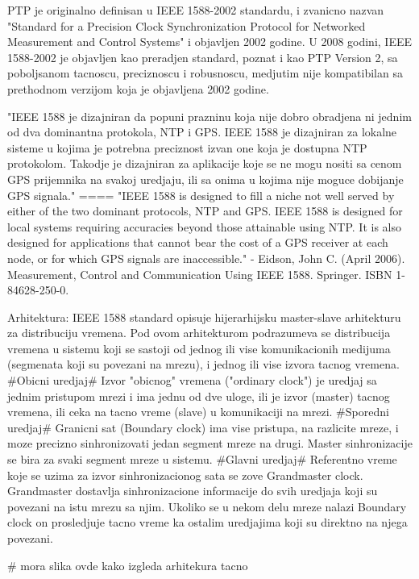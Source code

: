 \documentclass[a4paper,12pt, master]{etf}
\begin{document}
	PTP je originalno definisan u IEEE 1588-2002 standardu, i zvanicno nazvan
	"Standard for a Precision Clock Synchronization Protocol for Networked Measurement
	and Control Systems" i objavljen 2002 godine. U 2008 godini, IEEE 1588-2002 je
	objavljen kao preradjen standard, poznat i kao PTP Version 2, sa poboljsanom tacnoscu,
	preciznoscu i robusnoscu, medjutim nije kompatibilan sa prethodnom verzijom koja je 
	objavljena 2002 godine.

	"IEEE 1588 je dizajniran da popuni prazninu koja nije dobro obradjena ni jednim od dva
	dominantna protokola, NTP i GPS. IEEE 1588 je dizajniran za lokalne sisteme u kojima je
	potrebna preciznost izvan one koja je dostupna NTP protokolom. Takodje je dizajniran za
	aplikacije koje se ne mogu nositi sa cenom GPS prijemnika na svakoj uredjaju, ili sa onima 
	u kojima nije moguce dobijanje GPS signala."
	====
	"IEEE 1588 is designed to fill a niche not well served by either of the two dominant 
	protocols, NTP and GPS. IEEE 1588 is designed for local systems requiring accuracies 
	beyond those attainable using NTP. It is also designed for applications that cannot bear 
	the cost of a GPS receiver at each node, or for which GPS signals are inaccessible." - 
	Eidson, John C. (April
	2006). Measurement, Control and Communication Using IEEE 1588. Springer. ISBN 
	1-84628-250-0.

	Arhitektura:
	IEEE 1588 standard opisuje hijerarhijsku master-slave arhitekturu za distribuciju vremena. 
	Pod	ovom arhitekturom podrazumeva se distribucija vremena u sistemu koji se sastoji od 
	jednog ili vise komunikacionih medijuma (segmenata koji su povezani na mrezu), i jednog 
	ili vise izvora	tacnog vremena. \#Obicni uredjaj\# Izvor "obicnog" vremena ("ordinary 
	clock") je uredjaj sa jednim pristupom mrezi i ima jednu od dve uloge, ili je izvor  
	(master) tacnog vremena, ili ceka na tacno vreme (slave) u komunikaciji na mrezi. 
	\#Sporedni uredjaj\# Granicni sat (Boundary	clock) ima vise pristupa, na razlicite mreze, 
	i moze precizno sinhronizovati jedan segment mreze na drugi. Master sinhronizacije se bira 
	za svaki segment mreze u sistemu. \#Glavni	uredjaj\# Referentno vreme koje se uzima za 
	izvor sinhronizacionog sata se zove Grandmaster	clock. Grandmaster dostavlja 
	sinhronizacione informacije do svih uredjaja koji su povezani na istu mrezu sa njim. 
	Ukoliko se u nekom delu mreze nalazi Boundary clock on prosledjuje tacno vreme ka ostalim 
	uredjajima koji su direktno na njega povezani.

	\# mora slika ovde kako izgleda arhitekura tacno
\end{document}
